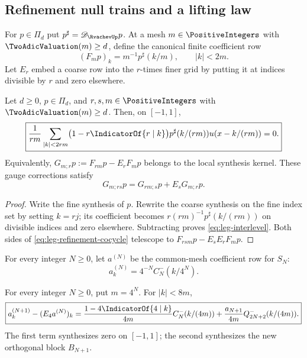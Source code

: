 {\subsection{Refinement null trains and a lifting law}

For $p\in\Pi_d$ put $p^\sharp=\mathscr D_{\RvachevUp}p$.  At a mesh
$m\in\PositiveIntegers$ with $\TwoAdicValuation(m)\ge d$, define the canonical finite coefficient
row
\[
 (F_mp)_k=m^{-1}p^\sharp(k/m),\qquad |k|<2m.
\]
Let $E_r$ embed a coarse row into the $r$-times finer grid by putting it at
indices divisible by $r$ and zero elsewhere.

\begin{theorem}
\label{thm:leg-interlevel}
Let $d\ge0$, $p\in\Pi_d$, and $r,s,m\in\PositiveIntegers$ with
$\TwoAdicValuation(m)\ge d$.  Then, on $[-1,1]$,
\begin{equation}
 \boxed{
 \frac1{rm}\sum_{|k|<2rm}
 \bigl(1-r\IndicatorOf{r\mid k}\bigr)
 p^\sharp(k/(rm))u(x-k/(rm))=0.}
 \label{eq:leg-interlevel}
\end{equation}
Equivalently, $G_{m;r}p:=F_{rm}p-E_rF_mp$ belongs to the local synthesis
kernel.  These gauge corrections satisfy
\begin{equation}
 \boxed{G_{m;rs}p=G_{rm;s}p+E_sG_{m;r}p.}
 \label{eq:leg-refinement-cocycle}
\end{equation}
\end{theorem}

\begin{proof}
Write the fine synthesis of $p$.  Rewrite the coarse synthesis on the fine
index set by setting $k=rj$; its coefficient becomes
$r(rm)^{-1}p^\sharp(k/(rm))$ on divisible indices and zero elsewhere.
Subtracting proves \eqref{eq:leg-interlevel}.  Both sides of
\eqref{eq:leg-refinement-cocycle} telescope to
$F_{rsm}p-E_sE_rF_mp$.
\end{proof}

For every integer $N\ge0$, let $a^{(N)}$ be the common-mesh coefficient row
for $S_N$:
\[
 a_k^{(N)}=4^{-N}C_N^-(k/4^N).
\]

\begin{corollary}
\label{cor:leg-lifting}
For every integer $N\ge0$, put $m=4^N$.  For $|k|<8m$,
\begin{equation}
 \boxed{
 a_k^{(N+1)}-(E_4a^{(N)})_k
 =\frac{1-4\IndicatorOf{4\mid k}}{4m}C_N^-(k/(4m))
 +\frac{a_{N+1}}{4m}Q_{2N+2}^-(k/(4m)).}
 \label{eq:leg-lifting}
\end{equation}
The first term synthesizes zero on $[-1,1]$; the second synthesizes the new
orthogonal block $B_{N+1}$.
\end{corollary}

}
